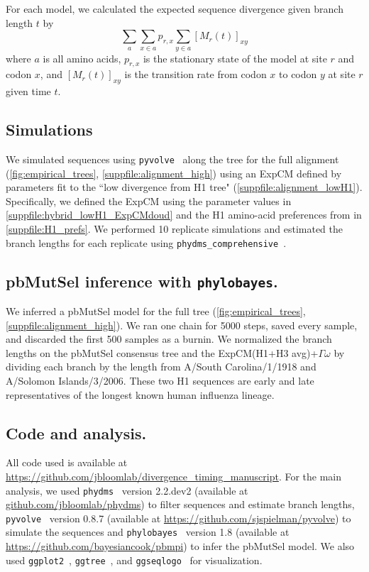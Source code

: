 \documentclass[11pt]{article}
\begin{document}
For each model, we calculated the expected sequence divergence given branch length $t$ by 
\begin{equation}
\label{eq:f}
\sum_a \sum_{x \in a} p_{r,x} \sum_{y \in a} [M_{r}\left(t\right)]_{xy}
\end{equation}
where $a$ is all amino acids, $p_{r,x}$ is the stationary state of the model at site $r$ and codon $x$, and $[M_{r}\left(t\right)]_{xy}$ is the transition rate from codon $x$ to codon $y$ at site $r$ given time $t$. 

\subsection*{Simulations}

We simulated sequences using \texttt{pyvolve}~\citep{spielman2015pyvolve} along the tree for the full alignment (\ref{fig:empirical_trees}, \ref{suppfile:alignment_high}) using an ExpCM defined by parameters fit to the ``low divergence from H1 tree" (\ref{suppfile:alignment_lowH1}). 
Specifically, we defined the ExpCM using the parameter values in \ref{suppfile:hybrid_lowH1_ExpCMdoud} and the H1 amino-acid preferences from \citet{doud2016accurate} in \ref{suppfile:H1_prefs}. 
We performed 10 replicate simulations and estimated the branch lengths for each replicate using \texttt{phydms\_comprehensive}~\citep{hilton2017phydms}. 

\subsection*{pbMutSel inference with \texttt{phylobayes}.}

We inferred a pbMutSel model for the full tree (\ref{fig:empirical_trees}, \ref{suppfile:alignment_high}). 
We ran one chain for 5000 steps, saved every sample, and discarded the first 500 samples as a burnin. 
We normalized the branch lengths on the pbMutSel consensus tree and the ExpCM(H1+H3 avg)+$\Gamma\omega$ by dividing each branch by the length from A/South Carolina/1/1918 and A/Solomon Islands/3/2006. 
These two H1 sequences are early and late representatives of the longest known human influenza lineage. 

\subsection*{Code and analysis.}
All code used is available at \url{https://github.com/jbloomlab/divergence_timing_manuscript}. 
For the main analysis, we used \texttt{phydms}~\citep{hilton2017phydms} version 2.2.dev2 (available at \url{github.com/jbloomlab/phydms}) to filter sequences and estimate branch lengths, \texttt{pyvolve}~\citep{spielman2015pyvolve} version 0.8.7 (available at \url{https://github.com/sjspielman/pyvolve}) to simulate the sequences and \texttt{phylobayes}~\citep{rodrigue2014site} version 1.8 (available at \url{https://github.com/bayesiancook/pbmpi}) to infer the pbMutSel model. We also used \texttt{ggplot2}~\citep{wickham2016ggplot2}, \texttt{ggtree}~\citep{yu2017ggtree}, and \texttt{ggseqlogo}~\citep{wagih2017ggseqlogo} for visualization.
\end{document}
